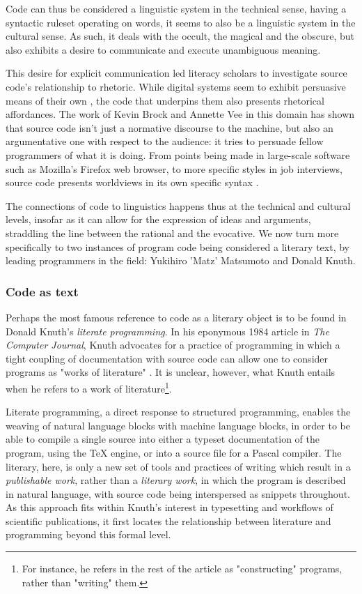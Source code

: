 Code can thus be considered a linguistic system in the technical sense, having a syntactic ruleset operating on words, it seems to also be a linguistic system in the cultural sense. As such, it deals with the occult, the magical and the obscure, but also exhibits a desire to communicate and execute unambiguous meaning.

This desire for explicit communication led literacy scholars to investigate source code's relationship to rhetoric. While digital systems seem to exhibit persuasive means of their own \citep{bogost_rhetoric_2008} \citep{frasca_simulation_2013}, the code that underpins them also presents rhetorical affordances. The work of Kevin Brock and Annette Vee in this domain has shown that source code isn't just a normative discourse to the machine, but also an argumentative one with respect to the audience: it tries to persuade fellow programmers of what it is doing. From points being made in large-scale software such as Mozilla's Firefox web browser, to more specific styles in job interviews, source code presents worldviews in its own specific syntax \citep{brock_rhetorical_2019}.

The connections of code to linguistics happens thus at the technical and cultural levels, insofar as it can allow for the expression of ideas and arguments, straddling the line between the rational and the evocative. We now turn more specifically to two instances of program code being considered a literary text, by leading programmers in the field: Yukihiro 'Matz' Matsumoto and Donald Knuth.

\subsubsection{Code as text}
\label{subsubsec:code-text}

Perhaps the most famous reference to code as a literary object is to be found in Donald Knuth's \emph{literate programming}. In his eponymous 1984 article in \emph{The Computer Journal}, Knuth advocates for a practice of programming in which a tight coupling of documentation with source code can allow one to consider programs as "works of literature" \citep{knuth_literate_1984}. It is unclear, however, what Knuth entails when he refers to a work of literature\footnote{For instance, he refers in the rest of the article as "constructing" programs, rather than "writing" them.}.

Literate programming, a direct response to structured programming, enables the weaving of natural language blocks with machine language blocks, in order to be able to compile a single source into either a typeset documentation of the program, using the TeX engine, or into a source file for a Pascal compiler. The literary, here, is only a new set of tools and practices of writing which result in a \emph{publishable work}, rather than a \emph{literary work}, in which the program is described in natural language, with source code being interspersed as snippets throughout. As this approach fits within Knuth's interest in typesetting and workflows of scientific publications, it first locates the relationship between literature and programming beyond this formal level.

